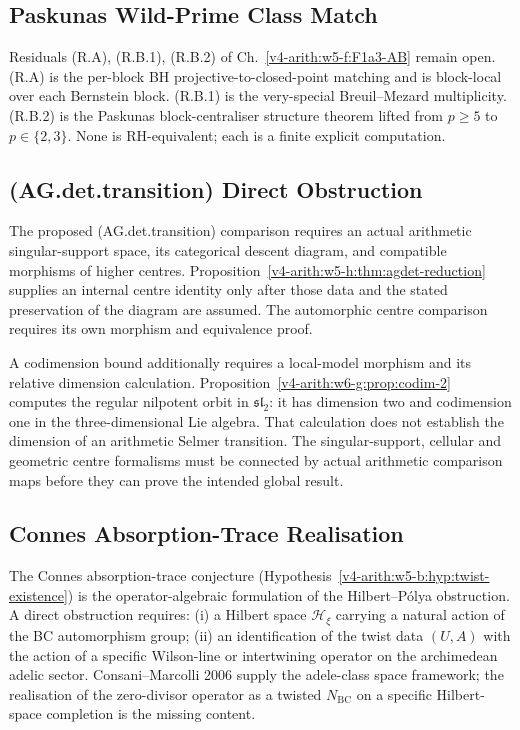 \subsection{Paskunas Wild-Prime Class Match}
\label{v4-arith:w5-synth:paskunas-wild}

Residuals (R.A), (R.B.1), (R.B.2) of Ch.~\ref{v4-arith:w5-f:F1a3-AB} remain open. (R.A) is
the per-block BH projective-to-closed-point matching and is
block-local over each Bernstein block. (R.B.1) is the
very-special Breuil--Mezard multiplicity. (R.B.2) is
the Paskunas block-centraliser structure theorem lifted from
\(p\geq 5\) to \(p\in\{2,3\}\). None is RH-equivalent;
each is a finite explicit computation.

\subsection{(AG.det.transition) Direct Obstruction}
\label{v4-arith:w5-synth:AG-det-transition}

The proposed (AG.det.transition) comparison requires an actual
arithmetic singular-support space, its categorical descent diagram,
and compatible morphisms of higher centres.
Proposition~\ref{v4-arith:w5-h:thm:agdet-reduction} supplies an internal
centre identity only after those data and the stated preservation
of the diagram are assumed. The automorphic centre comparison
requires its own morphism and equivalence proof.

A codimension bound additionally requires a local-model morphism
and its relative dimension calculation.
Proposition~\ref{v4-arith:w6-g:prop:codim-2} computes the regular nilpotent
orbit in $\mathfrak{sl}_2$: it has dimension two and codimension
one in the three-dimensional Lie algebra.
That calculation does not establish the dimension of an arithmetic
Selmer transition. The singular-support, cellular and geometric
centre formalisms must be connected by actual arithmetic comparison
maps before they can prove the intended global result.

\subsection{Connes Absorption-Trace Realisation}
\label{v4-arith:w5-synth:connes-absorption}

The Connes absorption-trace conjecture
(Hypothesis~\ref{v4-arith:w5-b:hyp:twist-existence}) is the operator-algebraic
formulation of the Hilbert--P\'olya obstruction. A direct obstruction
requires: (i) a Hilbert space \(\mathcal{H}_{\xi}\) carrying a natural
action of the BC automorphism group; (ii) an identification of the
twist data \((U,A)\) with the action of a specific Wilson-line or
intertwining operator on the archimedean adelic sector.
Consani--Marcolli 2006 supply the adele-class space framework; the
realisation of the zero-divisor operator as a twisted
\(N_{\mathrm{BC}}\) on a specific Hilbert-space completion is the
missing content.

